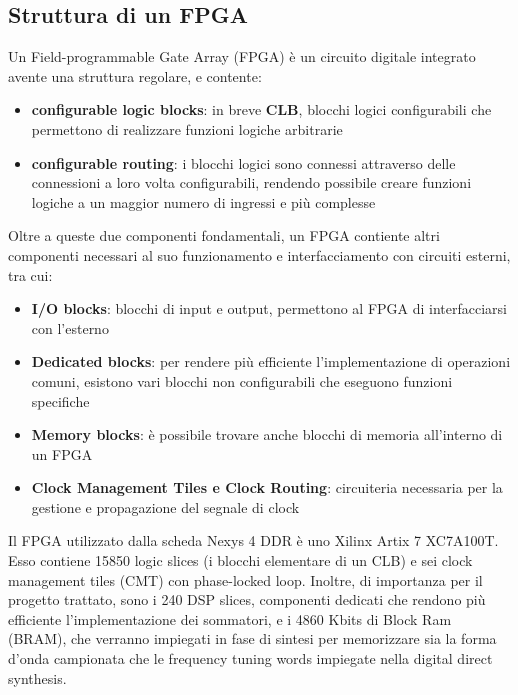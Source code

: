 \subsection{Struttura di un FPGA}
Un Field-programmable Gate Array (FPGA) è un circuito digitale integrato
avente una struttura regolare, e contente:
\begin{itemize}
    \item \textbf{configurable logic blocks}: in breve \textbf{CLB}, blocchi
            logici configurabili che permettono di realizzare funzioni
            logiche arbitrarie
    \item \textbf{configurable routing}: i blocchi logici sono connessi
          attraverso delle connessioni a loro volta configurabili,
          rendendo possibile creare funzioni logiche a un maggior numero
          di ingressi e più complesse
\end{itemize}

Oltre a queste due componenti fondamentali, un FPGA contiente altri
componenti necessari al suo funzionamento e interfacciamento con
circuiti esterni, tra cui:

\begin{itemize}
    \item \textbf{I/O blocks}: blocchi di input e output,
           permettono al FPGA di interfacciarsi con l'esterno
    \item \textbf{Dedicated blocks}: per rendere più efficiente
           l'implementazione di operazioni comuni, esistono vari blocchi
           non configurabili che eseguono funzioni specifiche
    \item \textbf{Memory blocks}: è possibile trovare anche blocchi di
           memoria all'interno di un FPGA
    \item \textbf{Clock Management Tiles e Clock Routing}: circuiteria necessaria per 
           la gestione e propagazione del segnale di clock
\end{itemize}

Il FPGA utilizzato dalla scheda Nexys 4 DDR è uno Xilinx Artix 7 XC7A100T.
Esso contiene 15850 logic slices (i blocchi elementare di un CLB) e sei
 clock management tiles (CMT) con phase-locked loop.
Inoltre, di importanza per il progetto trattato, sono i 240 DSP slices, 
componenti dedicati che rendono più efficiente
l'implementazione dei sommatori, e i 4860 Kbits di Block Ram (BRAM),
che verranno impiegati in fase di sintesi per memorizzare sia la forma
d'onda campionata che le frequency tuning words impiegate nella digital
direct synthesis.

